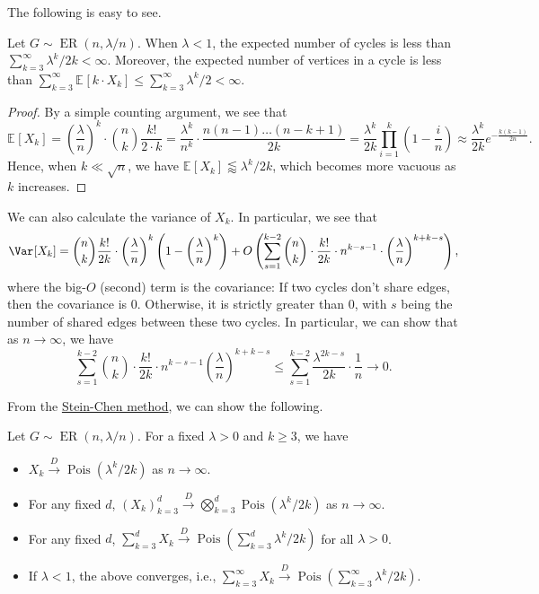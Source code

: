 The following is easy to see.

\begin{lemma}\label{lma:cycle-counting-mean}
	Let \(G \sim \operatorname{ER}(n, \lambda / n) \). When \(\lambda < 1\), the expected number of cycles is less than \(\sum_{k=3}^{\infty} \lambda ^k / 2k < \infty \). Moreover, the expected number of vertices in a cycle is less than \(\sum_{k=3}^{\infty} \mathbb{E}_{}[k \cdot X_k] \leq \sum_{k=3}^{\infty} \lambda ^k / 2 < \infty \).
\end{lemma}
\begin{proof}
	By a simple counting argument, we see that
	\[
		\mathbb{E}_{}[X_k]
		= \left( \frac{\lambda}{n} \right) ^k \cdot \binom{n}{k} \frac{k!}{2 \cdot k}
		= \frac{\lambda ^k}{n^k} \cdot \frac{n(n-1) \dots (n-k+1)}{2k}
		= \frac{\lambda ^k}{2k} \prod_{i=1}^{k} \left( 1 - \frac{i}{n} \right)
		\approx \frac{\lambda ^k}{2k} e^{- \frac{k (k-1)}{2n}}.
	\]
	Hence, when \(k \ll \sqrt{n} \), we have \(\mathbb{E}_{}[X_k] \lessapprox \lambda ^k / 2k\), which becomes more vacuous as \(k\) increases.
\end{proof}

We can also calculate the variance of \(X_k\). In particular, we see that
\[
	\Var_{}[X_k]
	= \binom{n}{k} \frac{k!}{2k} \cdot \left( \frac{\lambda}{n} \right) ^k \left( 1 - \left( \frac{\lambda}{n} \right) ^k \right) + O\left( \sum_{s=1}^{k-2} \binom{n}{k} \cdot \frac{k!}{2k} \cdot n^{k - s - 1} \cdot \left( \frac{\lambda}{n} \right)^{k + k - s} \right),
\]
where the big-\(O\) (second) term is the covariance: If two cycles don't share edges, then the covariance is \(0\). Otherwise, it is strictly greater than \(0\), with \(s\) being the number of shared edges between these two cycles. In particular, we can show that as \(n \to \infty \), we have
\[
	\sum_{s=1}^{k-2} \binom{n}{k} \cdot \frac{k!}{2k} \cdot n^{k - s - 1} \left( \frac{\lambda }{n} \right) ^{k + k - s}
	\leq \sum_{s=1}^{k-2} \frac{\lambda ^{2k - s}}{2k} \cdot \frac{1}{n} \to 0.
\]

From the \hyperref[thm:Stein-Chen-method]{Stein-Chen method}, we can show the following.

\begin{theorem}\label{thm:cycle-counting}
	Let \(G \sim \operatorname{ER}(n, \lambda / n) \). For a fixed \(\lambda > 0\) and \(k \geq 3\), we have
	\begin{itemize}
		\item \(X_k \overset{D}{\to} \operatorname{Pois}(\lambda ^k / 2k) \) as \(n \to \infty \).
		\item For any fixed \(d\), \((X_k)_{k = 3}^d \overset{D}{\to} \bigotimes_{k=3}^d \operatorname{Pois}(\lambda ^k / 2k) \) as \(n \to \infty \).
		\item For any fixed \(d\), \(\sum_{k=3}^{d} X_k \overset{D}{\to} \operatorname{Pois}(\sum_{k=3}^{d} \lambda ^k / 2k) \) for all \(\lambda > 0\).
		\item If \(\lambda < 1\), the above converges, i.e., \(\sum_{k=3}^{\infty} X_k \overset{D}{\to} \operatorname{Pois}(\sum_{k=3}^{\infty} \lambda ^k / 2k) \).
	\end{itemize}
\end{theorem}

